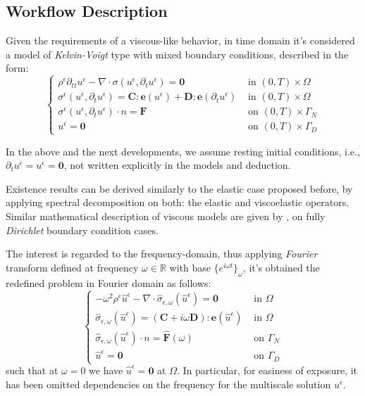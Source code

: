 \subsection{Workflow Description}
Given the requirements of a viscous-like behavior, in time domain it's considered a model of \textit{Kelvin-Voigt} type with mixed boundary conditions, described in the form:
\begin{equation*}
    \left \{
    \begin{array}{cc}
        \rho^{\epsilon}\partial_{tt}u^{\epsilon} - \nabla \cdot \sigma(u^{\epsilon}, \partial_t u^{\epsilon}) = \mathbf{0} & \text{ in } (0,T) \times \Omega\\
        \sigma^{\epsilon}(u^{\epsilon},\partial_t u^{\epsilon})  = \mathbf{C}:\mathbf{e}(u^{\epsilon}) + \mathbf{D}:\mathbf{e}(\partial_t u^{\epsilon}) & \text{ in } (0,T) \times \Omega\\
        \sigma^{\epsilon}(u^{\epsilon}, \partial_t u^{\epsilon})\cdot n = \mathbf{F} & \text{ on } (0,T) \times \Gamma_N\\ 
        u^{\epsilon} = \mathbf{0} & \text{ on } (0,T) \times \Gamma_D
    \end{array}
    \right .
    \label{ViscoElasticModel}
\end{equation*}
\begin{rem}
In the above and the next developments, we assume resting initial conditions, i.e., $\partial_t u^{\epsilon} = u^{\epsilon} = \mathbf{0}$, not written explicitly in the models and deduction.
\end{rem}
Existence results can be derived similarly to the elastic case proposed before, by applying spectral decomposition on both: the elastic and viscoelastic operators. Similar mathematical description of viscous models are given by \cite{Abdessamad2009}, \cite{Boughammoura2013} on fully \textit{Dirichlet} boundary condition cases.

The interest is regarded to the frequency-domain, thus applying \textit{Fourier} transform defined at frequency $\omega \in \mathbb{R}$ with base $\{e^{i\omega t}\}_{\omega}$, it's obtained the redefined problem in Fourier domain as follows:
\begin{equation*}
    \left \{
    \begin{array}{cc}
        -\omega^2 \rho^{\epsilon} \hat{u}^{\epsilon} - \nabla \cdot \hat{\sigma}_{\epsilon,\omega}(\hat{u}^{\epsilon}) = \mathbf{0} & \text{ in } \Omega  \\
        \hat{\sigma}_{\epsilon,\omega} (\hat{u}^{\epsilon}) = (\mathbf{C} + i\omega \mathbf{D}):\mathbf{e}(\hat{u}^{\epsilon}) & \text{ in } \Omega \\
        \hat{\sigma}_{\epsilon,\omega} (\hat{u}^{\epsilon}) \cdot n = \hat{\mathbf{F}}(\omega) & \text{ on } \Gamma_N \\
        \hat{u}^{\epsilon} = \mathbf{0} & \text{ on } \Gamma_D
    \end{array}
    \right .
\end{equation*}
such that at $\omega = 0$ we have $\hat{u}^{\epsilon}=\mathbf{0}$ at $\Omega$. In particular, for easiness of exposure, it has been omitted dependencies on the frequency for the multiscale solution $u^{\epsilon}$.\\


